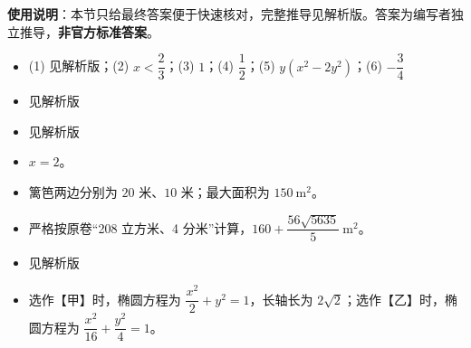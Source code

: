 
\begin{gknotice}
\textbf{使用说明}：本节只给最终答案便于快速核对，完整推导见解析版。答案为编写者独立推导，\textbf{非官方标准答案}。
\end{gknotice}

\begin{itemize}[leftmargin=2.6em]
  \item[\textbf{1.}] (1) 见解析版；(2) $x<\dfrac23$；(3) $1$；(4) $\dfrac12$；(5) $y(x^2-2y^2)$；(6) $-\dfrac34$
  \item[\textbf{2.}] 见解析版
  \item[\textbf{3.}] 见解析版
  \item[\textbf{4.}] $x=2$。
  \item[\textbf{5.}] 篱笆两边分别为 $20$ 米、$10$ 米；最大面积为 $150\ \mathrm{m^2}$。
  \item[\textbf{6.}] 严格按原卷“208 立方米、4 分米”计算，$160+\dfrac{56\sqrt{5635}}5\ \mathrm{m^2}$。
  \item[\textbf{7.}] 见解析版
  \item[\textbf{8.}] 选作【甲】时，椭圆方程为 $\dfrac{x^2}{2}+y^2=1$，长轴长为 $2\sqrt2$；选作【乙】时，椭圆方程为 $\dfrac{x^2}{16}+\dfrac{y^2}{4}=1$。
\end{itemize}
